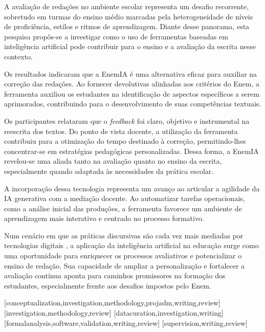 \documentclass[portuguese]{textolivre}
\begin{document}
A avaliação de redações no ambiente escolar representa um desafio recorrente, sobretudo em turmas do ensino médio marcadas pela heterogeneidade de níveis de proficiência, estilos e ritmos de aprendizagem. Diante desse panorama, esta pesquisa propôs-se a investigar como o uso de ferramentas baseadas em inteligência artificial pode contribuir para o ensino e a avaliação da escrita nesse contexto.

Os resultados indicaram que a EnemIA é uma alternativa eficaz para auxiliar na correção das redações. Ao fornecer devolutivas alinhadas aos critérios do Enem, a ferramenta auxiliou os estudantes na identificação de aspectos específicos a serem aprimorados, contribuindo para o desenvolvimento de suas competências textuais. 

Os participantes relataram que o \textit{feedback} foi claro, objetivo e instrumental na reescrita dos textos.
Do ponto de vista docente, a utilização da ferramenta contribuiu para a otimização do tempo destinado à correção, permitindo-lhes concentrar-se em estratégias pedagógicas personalizadas. Dessa forma, a EnemIA revelou-se uma aliada tanto na avaliação quanto no ensino da escrita, especialmente quando adaptada às necessidades da prática escolar. 

A incorporação dessa tecnologia representa um avanço ao articular a agilidade da IA generativa com a mediação docente. Ao automatizar tarefas operacionais, como a análise inicial das produções, a ferramenta favorece um ambiente de aprendizagem mais interativo e centrado no processo formativo.

Num cenário em que as práticas discursivas são cada vez mais mediadas por tecnologias digitais \cite{gomes2018generos}, a aplicação da inteligência artificial na educação surge como uma oportunidade para enriquecer os processos avaliativos e potencializar o ensino de redação. Sua capacidade de ampliar a personalização e fortalecer a avaliação contínua aponta para caminhos promissores na formação dos estudantes, especialmente frente aos desafios impostos pelo Enem.

\printbibliography\label{sec-bib}


\begin{contributors}
[conceptualization,investigation,methodology,projadm,writing,review]
[investigation,methodology,review]
[datacuration,investigation,writing]
[formalanalysis,software,validation,writing,review]
[supervision,writing,review]
\end{contributors}
\end{document}
